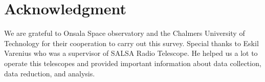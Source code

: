 \documentclass[10pt,conference]{IEEEtran}
\begin{document}
\section*{Acknowledgment}

We are grateful to Onsala Space observatory and the Chalmers University of Technology for their cooperation to carry out this survey. Special thanks to Eskil Varenius who was a supervisor of SALSA Radio Telescope. He helped us a lot to operate this telescopes and provided important information about data collection, data reduction, and analysis.






\end{document}
